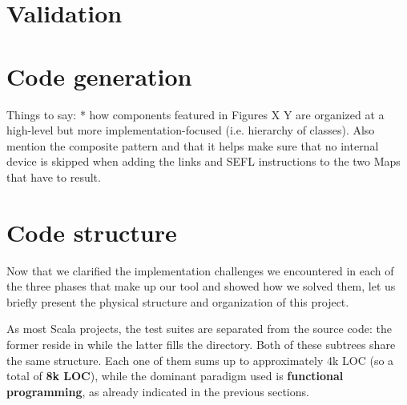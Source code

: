 \section{Validation}


\section{Code generation}\label{sec:codegen}
Things to say:
* how components featured in Figures X Y are organized at a high-level but more
implementation-focused (i.e. hierarchy of classes).  Also mention the composite
pattern and that it helps make sure that no internal device is skipped when
adding the links and SEFL instructions to the two Maps that have to result.



\section{Code structure}

Now that we clarified the implementation challenges we encountered in each of
the three phases that make up our tool and showed how we solved them, let us
briefly present the physical structure and organization of this project.

As most Scala projects, the test suites are separated from the source code: the
former reside in  while the latter fills the 
directory.  Both of these subtrees share the same structure.  Each one of them
sums up to approximately 4k LOC (so a total of \textbf{8k LOC}), while the
dominant paradigm used is \textbf{functional programming}, as already indicated
in the previous sections.

